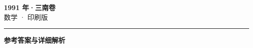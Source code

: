 \documentclass[zihao=5, a4paper]{ctexart}
\begin{document}
\begin{center}
  {\Large\bfseries 1991 年·三南卷}\\[4pt]
  {\large 数学 · 印刷版}
\end{center}
\medskip
{}

\par\bigskip\hrule\bigskip
{}
\begin{center}{\large\bfseries 参考答案与详细解析}\end{center}
\smallskip

\end{document}
